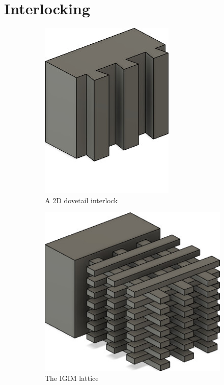 \section{Interlocking}



\begin{figure}
	\centering
	\setlength{\figheight}{.3\columnwidth}
	\begin{subfigure}[B]{.3\columnwidth}
		\includegraphics[height=\figheight]{sources/method/basic_2d_interlock.jpg}
		\caption{A 2D dovetail interlock}
		\label{fig:basic_2d_interlock}
	\end{subfigure}
	\begin{subfigure}[B]{.39\columnwidth}
		\includegraphics[height=\figheight]{sources/method/basic_lattice.jpg}
		\caption{The IGIM lattice}
		\label{fig:basic_structure_single_mat}
	\end{subfigure}
	\begin{subfigure}[B]{.29\columnwidth}

\end{subfigure}
\end{figure}
